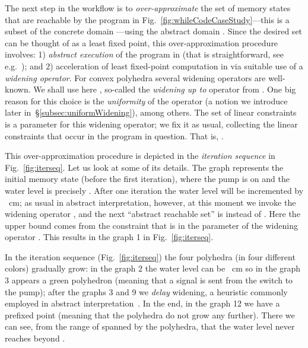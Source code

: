 \documentclass[envcountsect,orivec]{llncs} \pdfoutput=1
\theoremstyle{definition}
\begin{document}
The next step in the workflow is to \emph{over-approximate} the set of
memory states that are reachable by the program in
Fig.~\ref{fig:whileCodeCaseStudy}---this  is a subset of the concrete domain
---using the abstract domain
. Since the desired set can be thought of as a least
fixed point, this over-approximation procedure involves: 1)
\emph{abstract execution} of the program in  (that is
straightforward, see e.g.~\cite{Cousot1978}); and 2) acceleration of
least fixed-point computation in  via suitable use of a
\emph{widening operator}. For convex polyhedra  several
 widening operators are well-known. We shall use here , so-called the
\emph{widening up
to } operator from \cite{Halbwachs1993, Halbwachs1997}. One big
reason for this choice is the \emph{uniformity} of the operator (a
notion we introduce later in~\S{}\ref{subsec:uniformWidening}), among
others. The set  of linear constraints is a parameter for this
widening operator; we fix it as usual, collecting the linear constraints
that occur in the program in question. That is, . 

This over-approximation procedure is depicted in the \emph{iteration
sequence} in Fig.~\ref{fig:iterseq}. Let us look at some of its
details. The graph  represents the initial memory state (before
the first iteration), where the pump is on and the water level  is precisely
. After one iteration the water level will be incremented by ~cm; as usual in abstract interpretation, however, at this moment we invoke the widening
operator
, and the next ``abstract reachable set'' is 
instead of . Here the 
upper bound  comes from
the constraint
 that is in the parameter  of the widening operator
. 
This
results in the graph 1 in Fig.~\ref{fig:iterseq}. 
















In the iteration sequence (Fig.~\ref{fig:iterseq}) the four 
polyhedra (in four different colors) gradually grow: in the graph 2 the water
level  can be ~cm so in the graph 3 appears a green polyhedron
(meaning that a
signal is sent from the switch to the pump); after the graphs 3 and 9 we
\emph{delay} widening, a heuristic commonly employed in abstract
interpretation~\cite{Cousot1981}. In the end, in the graph 12 we have a
prefixed point (meaning that the polyhedra do not grow any further). There
we can see, from the range of  spanned by the polyhedra, that the
water level never reaches beyond . 
\end{document}
